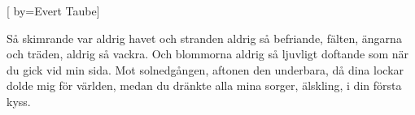 


[ 	%
	by={Evert Taube}]		%
	
\beginverse*		%
Så skimrande var aldrig havet
och stranden aldrig så befriande, 
fälten, ängarna och träden, aldrig så vackra.
Och blommorna aldrig så ljuvligt doftande
som när du gick vid min sida.
Mot solnedgången, aftonen den underbara, 
då dina lockar dolde mig för världen, 
medan du dränkte alla mina sorger, 
älskling, i din första kyss.
\endverse			%
\endsong			%
